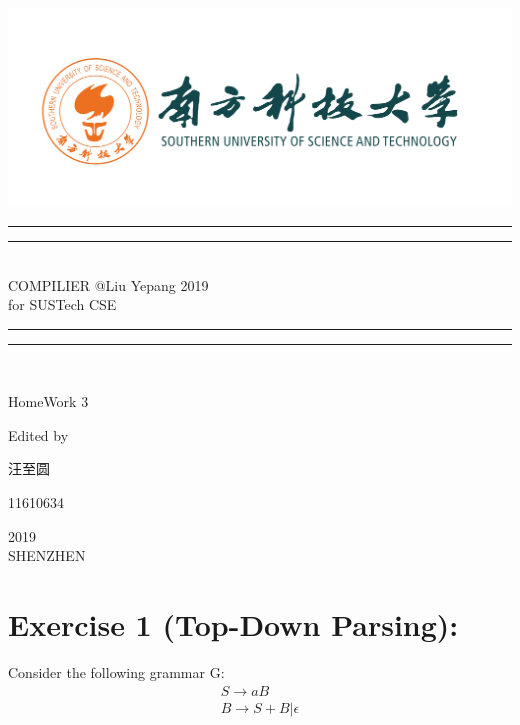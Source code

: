 \documentclass{article}
\begin{document}
 
    \begin{titlepage}       %
        \centering
        \includegraphics[width=\textwidth]{../SUSTC_LOGO.png}
        \rule{\textwidth}{1.6pt}\vspace*{-\baselineskip}\vspace*{2pt}
        \rule{\textwidth}{0.4pt}\\[\baselineskip]
        {\LARGE COMPILIER @Liu Yepang 2019\\[\baselineskip]\small for SUSTech CSE}
        \\[0.2\baselineskip]
        \rule{\textwidth}{0.4pt}\vspace*{-\baselineskip}\vspace{3.2pt}
        \rule{\textwidth}{1.6pt}\\[\baselineskip]
        \scshape
        \vspace*{\baselineskip}
        {\Large HomeWork 3\par }
        Edited by \\[\baselineskip] {汪至圆\par}
        {\Large 11610634\par }
        \vfill
        {\scshape 2019} \\{\large SHENZHEN}\par
    \end{titlepage}
    \section{Exercise 1 (Top-Down Parsing): }
    Consider the following grammar G:
    $$
        \begin{array}{c}{S \rightarrow a B} \\ {B \rightarrow S+B | \epsilon}\end{array}
    $$
\end{document}
